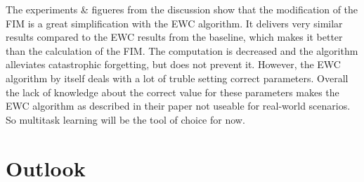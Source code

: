 The experiments \& figueres from the discussion show that the modification of the FIM is a great simplification with the EWC algorithm.
It delivers very similar results compared to the EWC results from the baseline, which makes it better than the calculation of the FIM.
The computation is decreased and the algorithm alleviates catastrophic forgetting, but does not prevent it.
However, the EWC algorithm by itself deals with a lot of truble setting correct parameters.
Overall the lack of knowledge about the correct value for these parameters makes the EWC algorithm as described in their paper not useable for real-world scenarios.
So multitask learning will be the tool of choice for now.

\section{Outlook}

